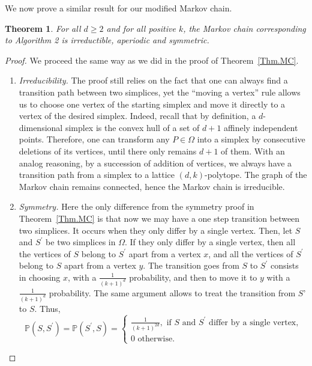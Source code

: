 \documentclass[a4paper]{article}
\newtheorem{theorem}{Theorem}
\begin{document}
We now prove a similar result for our modified Markov chain.

\begin{theorem}\label{Thm.Move}
  For all $d\geq2$ and for all positive $k$, the Markov chain corresponding to Algorithm 2 is irreductible, aperiodic and symmetric.
\end{theorem}

\begin{proof}
  We proceed the same way as we did in the proof of Theorem~\ref{Thm.MC}.

  \begin{enumerate}[i]
    \item \textit{Irreducibility.}
    The proof still relies on the fact that one can always find a transition path between two simplices, yet the ``moving a vertex'' rule allows us to choose one vertex of the starting simplex and move it directly to a vertex of the desired simplex. Indeed, recall that by definition, a $d$-dimensional simplex is the convex hull of a set of $d+1$ affinely independent points. Therefore, one can transform any $P\in\Omega$ into a simplex by consecutive deletions of its vertices, until there only remains $d+1$ of them. With an analog reasoning, by a succession of addition of vertices, we always have a transition path from a simplex to a lattice $(d,k)$-polytope. The graph of the Markov chain remains connected, hence the Markov chain is irreducible.

    \item \textit{Symmetry.}
    Here the only difference from the symmetry proof in Theorem~\ref{Thm.MC} is that now we may have a one step transition between two simplices. It occurs when they only differ by a single vertex. Then, let $S$ and $S^\prime$ be two simplices in $\Omega$. If they only differ by a single vertex, then all the vertices of $S$ belong to $S^\prime$ apart from a vertex $x$, and all the vertices of $S^\prime$ belong to $S$ apart from a vertex $y$. The transition goes from $S$ to $S^\prime$ consists in choosing $x$, with a $\frac{1}{(k+1)^d}$ probability, and then to move it to $y$ with a $\frac{1}{(k+1)^d}$ probability. The same argument allows to treat the transition from $S’$ to $S$. Thus,
    $$
      \mathbb{P}(S,S^\prime)=\mathbb{P}(S^\prime,S)=
      \begin{cases}
        \displaystyle\frac{1}{(k+1)^{2d}} , \text{ if } S \text{ and } S^\prime \text{ differ by a single vertex,}\\
        0 \text{ otherwise.}
      \end{cases}
    $$


\end{enumerate}
\end{proof}
\end{document}
